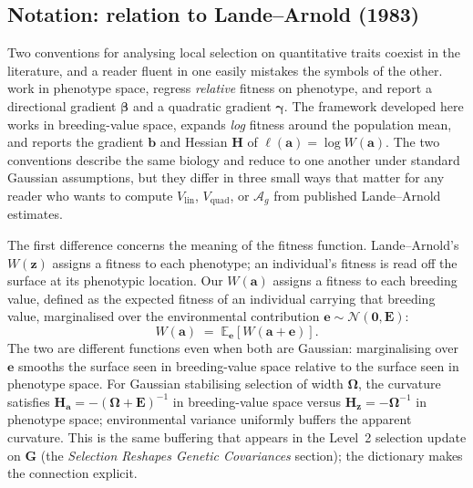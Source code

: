 \documentclass[9pt,twocolumn,twoside,lineno]{gsajnl}
\newcommand{\vect}[1]{\boldsymbol{#1}}
\newcommand{\mat}[1]{\mathbf{#1}}
\newcommand{\Ag}{\ensuremath{\mathcal{A}_{g}}\xspace}
\newcommand{\Vlin}{\ensuremath{V_{\text{lin}}}\xspace}
\newcommand{\Vquad}{\ensuremath{V_{\text{quad}}}\xspace}
\begin{document}
\subsection{Notation: relation to Lande--Arnold (1983)}
\label{sec:notation_dictionary}

Two conventions for analysing local selection on quantitative traits coexist in the literature, and a reader fluent in one easily mistakes the symbols of the other. \citet{LandeArnold1983} work in phenotype space, regress \emph{relative} fitness on phenotype, and report a directional gradient $\bm{\beta}$ and a quadratic gradient $\bm{\gamma}$. The framework developed here works in breeding-value space, expands \emph{log} fitness around the population mean, and reports the gradient $\vect{b}$ and Hessian $\mat{H}$ of $\ell(\vect{a}) = \log W(\vect{a})$. The two conventions describe the same biology and reduce to one another under standard Gaussian assumptions, but they differ in three small ways that matter for any reader who wants to compute $\Vlin$, $\Vquad$, or \Ag from published Lande--Arnold estimates.

The first difference concerns the meaning of the fitness function. Lande--Arnold's $W(\vect{z})$ assigns a fitness to each phenotype; an individual's fitness is read off the surface at its phenotypic location. Our $W(\vect{a})$ assigns a fitness to each breeding value, defined as the expected fitness of an individual carrying that breeding value, marginalised over the environmental contribution $\vect{e}\sim\mathcal{N}(\vect{0},\mat{E})$:
\begin{equation}
W(\vect{a}) \;=\; \mathbb{E}_{\vect{e}}\!\left[W(\vect{a}+\vect{e})\right].
\label{eq:Wa_definition}
\end{equation}
The two are different functions even when both are Gaussian: marginalising over $\vect{e}$ smooths the surface seen in breeding-value space relative to the surface seen in phenotype space. For Gaussian stabilising selection of width $\bm{\Omega}$, the curvature satisfies $\mat{H}_{\vect{a}} = -(\bm{\Omega}+\mat{E})^{-1}$ in breeding-value space versus $\mat{H}_{\vect{z}} = -\bm{\Omega}^{-1}$ in phenotype space; environmental variance uniformly buffers the apparent curvature. This is the same buffering that appears in the Level~2 selection update on $\mat{G}$ (the \textit{Selection Reshapes Genetic Covariances} section); the dictionary makes the connection explicit.
\end{document}
